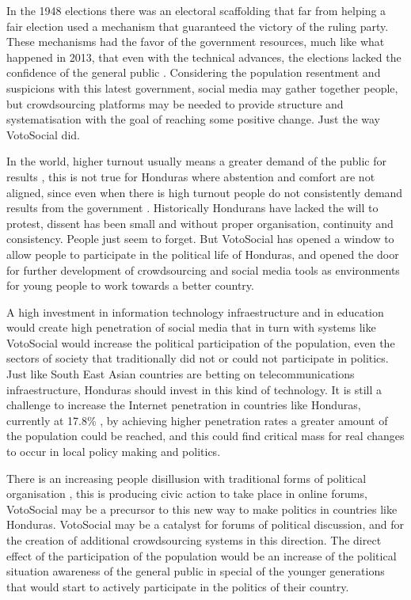 \documentclass[letterpaper,10pt]{article}
\begin{document}
In the 1948 elections there was an electoral scaffolding that far from helping a fair election used a mechanism that guaranteed the victory of the ruling party. These mechanisms had the favor of the government resources, much like what happened in 2013, that even with the technical advances, the elections lacked the confidence of the general public \citep{romero2014}. Considering the population resentment and suspicions with this latest government, social media may gather together people, but crowdsourcing platforms may be needed to provide structure and systematisation with the goal of reaching some positive change. Just the way VotoSocial did.

In the world, higher turnout usually means a greater demand of the public for results \citep{mac2003}, this is not true for Honduras where abstention and comfort are not aligned, since even when there is high turnout people do not consistently demand results from the government \citep{romero2014}. Historically Hondurans have lacked the will to protest, dissent has been small and without proper organisation, continuity and consistency. People just seem to forget. But VotoSocial has opened a window to allow people to participate in the political life of Honduras, and opened the door for further development of crowdsourcing and social media tools as environments for young people to work towards a better country.

A high investment in information technology infraestructure and in education would create high penetration of social media \citep{saadia2014} that in turn with systems like VotoSocial would increase the political participation of the population, even the sectors of society that traditionally did not or could not participate in politics. Just like South East Asian countries are betting on telecommunications infraestructure, Honduras should invest in this kind of technology. It is still a challenge to increase the Internet penetration in countries like Honduras, currently at 17.8\% \citep{webpenet}, by achieving higher penetration rates a greater amount of the population could be reached, and this could find critical mass for real changes to occur in local policy making and politics.

There is an increasing people disillusion with traditional forms of political organisation \citep{milan2013}, this is producing civic action to take place in online forums, VotoSocial may be a precursor to this new way to make politics in countries like Honduras. VotoSocial may be a catalyst for forums of political discussion, and for the creation of additional crowdsourcing systems in this direction. The direct effect of the participation of the population would be an increase of the political situation awareness of the general public in special of the younger generations that would start to actively participate in the politics of their country.
\end{document}
